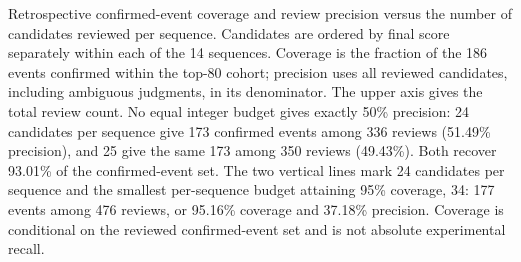 Retrospective confirmed-event coverage and review precision versus the number of candidates reviewed per sequence. Candidates are ordered by final score separately within each of the 14 sequences. Coverage is the fraction of the 186 events confirmed within the top-80 cohort; precision uses all reviewed candidates, including ambiguous judgments, in its denominator. The upper axis gives the total review count. No equal integer budget gives exactly 50\% precision: 24 candidates per sequence give 173 confirmed events among 336 reviews (51.49\% precision), and 25 give the same 173 among 350 reviews (49.43\%). Both recover 93.01\% of the confirmed-event set. The two vertical lines mark 24 candidates per sequence and the smallest per-sequence budget attaining 95\% coverage, 34: 177 events among 476 reviews, or 95.16\% coverage and 37.18\% precision. Coverage is conditional on the reviewed confirmed-event set and is not absolute experimental recall.
